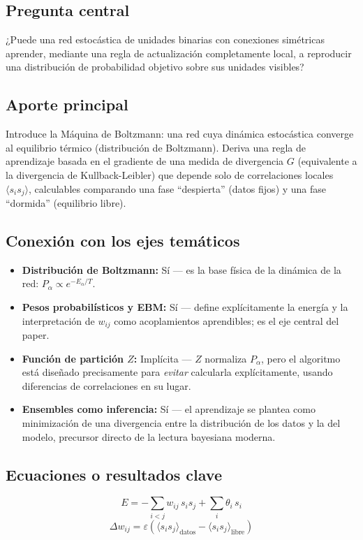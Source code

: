 \documentclass[12pt]{article}
\begin{document}
\subsection*{Pregunta central}
¿Puede una red estocástica de unidades binarias con conexiones simétricas aprender, mediante
una regla de actualización completamente local, a reproducir una distribución de probabilidad
objetivo sobre sus unidades visibles?

\subsection*{Aporte principal}
Introduce la Máquina de Boltzmann: una red cuya dinámica estocástica converge al equilibrio
térmico (distribución de Boltzmann). Deriva una regla de aprendizaje basada en el gradiente de
una medida de divergencia $G$ (equivalente a la divergencia de Kullback-Leibler) que depende
solo de correlaciones locales $\langle s_i s_j\rangle$, calculables comparando una fase
``despierta'' (datos fijos) y una fase ``dormida'' (equilibrio libre).

\subsection*{Conexión con los ejes temáticos}
\begin{itemize}
  \item \textbf{Distribución de Boltzmann:} Sí --- es la base física de la dinámica de la red: $P_\alpha \propto e^{-E_\alpha/T}$.
  \item \textbf{Pesos probabilísticos y EBM:} Sí --- define explícitamente la energía y la interpretación de $w_{ij}$ como acoplamientos aprendibles; es el eje central del paper.
  \item \textbf{Función de partición $Z$:} Implícita --- $Z$ normaliza $P_\alpha$, pero el algoritmo está diseñado precisamente para \emph{evitar} calcularla explícitamente, usando diferencias de correlaciones en su lugar.
  \item \textbf{Ensembles como inferencia:} Sí --- el aprendizaje se plantea como minimización de una divergencia entre la distribución de los datos y la del modelo, precursor directo de la lectura bayesiana moderna.
\end{itemize}

\subsection*{Ecuaciones o resultados clave}
\begin{equation}
E = -\sum_{i<j} w_{ij}\,s_i s_j + \sum_i \theta_i\, s_i
\end{equation}
\begin{equation}
\Delta w_{ij} = \varepsilon\left(\langle s_i s_j\rangle_{\text{datos}} - \langle s_i s_j\rangle_{\text{libre}}\right)
\end{equation}
\end{document}
